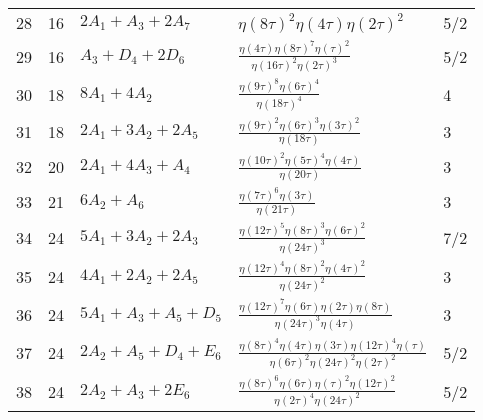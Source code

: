 \documentclass{article}
\theoremstyle{definition}
\begin{document}
\begin{longtable}{|l|l|l|l|l|}
  28 & 16 & $2 A_{1} +  A_{3} + 2 A_{7}$ & $ \eta \left( 8\tau \right)   ^{2}\eta \left( 4\tau \right)   \eta \left( 2\tau \right)   ^{2}$ & 5/2 \\ 
  29 & 16 & $ A_{3} +  D_{4} + 2 D_{6}$ & ${\frac {\eta \left( 4\tau \right)   \eta \left( 8\tau \right)   ^{7}  \eta \left( \tau \right)   ^{2}}{  \eta \left( 16\tau \right)   ^{2} \mbox{}  \eta \left( 2\tau \right)   ^{3}}}$ & 5/2 \\ 
  30 & 18 & $8 A_{1} + 4 A_{2}$ & ${\frac {  \eta \left( 9\tau \right)   ^{8}  \eta \left( 6\tau \right)   ^{4}}{  \eta \left( 18\tau \right)   ^{4}}}$ & 4 \\ 
  31 & 18 & $2 A_{1} + 3 A_{2} + 2 A_{5}$ & ${\frac {  \eta \left( 9\tau \right)   ^{2}  \eta \left( 6\tau \right)   ^{3}  \eta \left( 3\tau \right)   ^{2} \mbox{}}{\eta \left( 18\tau \right) }}$ & 3 \\ 
  32 & 20 & $2 A_{1} + 4 A_{3} +  A_{4}$ & ${\frac {  \eta \left( 10\tau \right)   ^{2}  \eta \left( 5\tau \right)   ^{4}\eta \left( 4\tau \right) }{\eta \left( 20 \mbox{}\tau \right) }}$ & 3 \\ 
  33 & 21 & $6 A_{2} +  A_{6}$ & ${\frac {  \eta \left( 7\tau \right)   ^{6}\eta \left( 3\tau \right) }{\eta \left( 21\tau \right) }}$ & 3 \\ 
  34 & 24 & $5 A_{1} + 3 A_{2} + 2 A_{3}$ & ${\frac {  \eta \left( 12\tau \right)   ^{5}  \eta \left( 8\tau \right)   ^{3}  \eta \left( 6\tau \right)   ^{2} \mbox{}}{  \eta \left( 24\tau \right)   ^{3}}}$ & 7/2 \\ 
  35 & 24 & $4 A_{1} + 2 A_{2} + 2 A_{5}$ & ${\frac {  \eta \left( 12\tau \right)   ^{4}  \eta \left( 8\tau \right)   ^{2}  \eta \left( 4\tau \right)   ^{2} \mbox{}}{  \eta \left( 24\tau \right)   ^{2}}}$ & 3 \\ 
  36 & 24 & $5 A_{1} +  A_{3} +  A_{5} +  D_{5}$ & ${\frac {  \eta \left( 12\tau \right)   ^{7}\eta \left( 6\tau \right) \eta \left( 2\tau \right) \eta \left( 8\tau \right) }{  \eta \left( 24\tau \right)   ^{3} \mbox{}\eta \left( 4\tau \right) }}$ & 3 \\ 
  37 & 24 & $2 A_{2} +  A_{5} +  D_{4} +  E_{6}$ & ${\frac {  \eta \left( 8\tau \right)   ^{4}\eta \left( 4\tau \right) \eta \left( 3\tau \right)   \eta \left( 12\tau \right)   ^{4} \mbox{}\eta \left( \tau \right) }{  \eta \left( 6\tau \right)   ^{2}  \eta \left( 24\tau \right)   ^{2}  \eta \left( 2\tau \right)   ^{2}}}$ & 5/2 \\ 
  38 & 24 & $2 A_{2} +  A_{3} + 2 E_{6}$ & ${\frac {  \eta \left( 8\tau \right)   ^{6}\eta \left( 6\tau \right)   \eta \left( \tau \right)   ^{2}  \eta \left( 12\tau \right)   ^{2} \mbox{}}{  \eta \left( 2\tau \right)   ^{4}  \eta \left( 24\tau \right)   ^{2}}}$ & 5/2 \\ 

\end{longtable}
\end{document}
